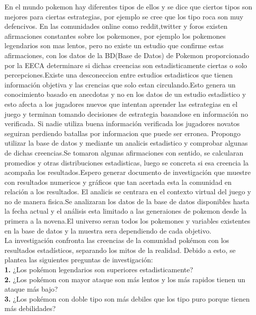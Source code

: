\documentclass[oneside,11pt]{Latex/Classes/PhDthesisPSnPDF}
\begin{document}
En el mundo pokemon hay diferentes tipos de ellos y se dice que ciertos
tipos son mejores para ciertas estrategias, por ejemplo se cree que los
tipo roca son muy defencivos. En las comunidades online como
reddit,twitter y foros existen afirmaciones constantes sobre los
pokemones, por ejemplo los pokemones legendarios son mas lentos, pero no
existe un estudio que confirme estas afirmaciones, con los datos de la
BD(Base de Datos) de Pokemon proporcionado por la EECA determinare si
dichas creencias son estadisticamente ciertas o solo percepciones.Existe
una desconeccion entre estudios estadisticos que tienen información
objetiva y las crencias que solo estan circulando.Esto genera un
conocimiento basado en anecdotas y no en los datos de un estudio
estadistico y esto afecta a los jugadores nuevos que intentan aprender
las estrategias en el juego y terminan tomando decisiones de estrategia
basandose en información no verificada. Si nadie utiliza buena
información verificada los jugadores novatos seguiran perdiendo batallas
por informacion que puede ser erronea. Propongo utilizar la base de
datos y mediante un analicis estadistico y comprobar algunas de dichas
creencias.Se tomaron algunas afirmaciones con sentido, se calcularan
promedios y otras distribuciones estadisticas, luego se concreta si esa
creencia la acompaña los resultados.Espero generar documento de
investigación que muestre con resultados numericos y gráficos que tan
acertada esta la comunidad en relación a los resultados. El analicis se
centrara en el contexto virtual del juego y no de manera fisica.Se
analizaran los datos de la base de datos disponibles hasta la fecha
actual y el análisis esta limitado a las generaiones de pokemon desde la
primera a la novena.El universo seran todos los pokemones y variables
existentes en la base de datos y la muestra sera dependiendo de cada
objetivo.\\

La investigación confronta las creencias de la comunidad pokémon con los
resultados estadísticos, separando los mitos de la realidad. Debido a
esto, se plantea las siguientes preguntas de investigación:\\

\textbf{1.} ¿Los pokémon legendarios son superiores estadisticamente?\\

\textbf{2.} ¿Los pokémon con mayor ataque son más lentos y los más
rapidos tienen un ataque más bajo?\\

\textbf{3.} ¿Los pokémon con doble tipo son más debiles que los tipo
puro porque tienen más debilidades?\\
\end{document}

